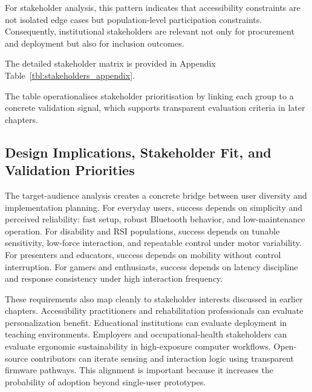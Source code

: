 For stakeholder analysis, this pattern indicates that accessibility constraints are not isolated edge cases but population-level participation constraints. Consequently, institutional stakeholders are relevant not only for procurement and deployment but also for inclusion outcomes.

The detailed stakeholder matrix is provided in Appendix Table~\ref{tbl:stakeholders_appendix}.



The table operationalises stakeholder prioritisation by linking each group to a concrete validation signal, which supports transparent evaluation criteria in later chapters.

\subsection{Design Implications, Stakeholder Fit, and Validation Priorities}

The target-audience analysis creates a concrete bridge between user diversity and implementation planning. For everyday users, success depends on simplicity and perceived reliability: fast setup, robust Bluetooth behavior, and low-maintenance operation. For disability and RSI populations, success depends on tunable sensitivity, low-force interaction, and repeatable control under motor variability. For presenters and educators, success depends on mobility without control interruption. For gamers and enthusiasts, success depends on latency discipline and response consistency under high interaction frequency. 

These requirements also map cleanly to stakeholder interests discussed in earlier chapters. Accessibility practitioners and rehabilitation professionals can evaluate personalization benefit. Educational institutions can evaluate deployment in teaching environments. Employers and occupational-health stakeholders can evaluate ergonomic sustainability in high-exposure computer workflows. Open-source contributors can iterate sensing and interaction logic using transparent firmware pathways. This alignment is important because it increases the probability of adoption beyond single-user prototypes.




